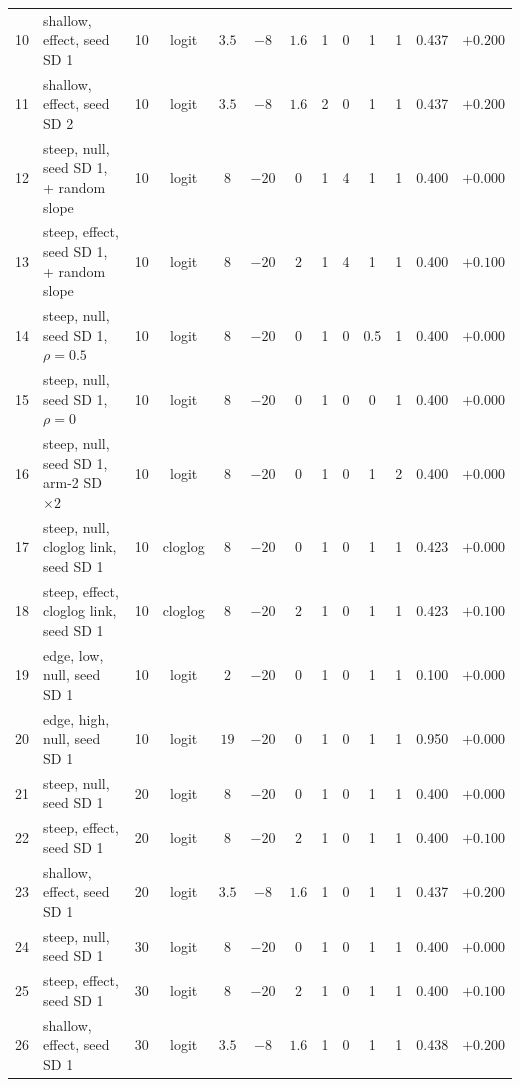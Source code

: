 \begin{table}[H]
\begin{tabular}{@{}rlcccccccccrr@{}}
10 & shallow, effect, seed SD 1 & 10 & logit & $3.5$ & $-8$ & $1.6$ & 1 & 0 & 1 & 1 & 0.437 & $+0.200$ \\
11 & shallow, effect, seed SD 2 & 10 & logit & $3.5$ & $-8$ & $1.6$ & 2 & 0 & 1 & 1 & 0.437 & $+0.200$ \\
12 & steep, null, seed SD 1, + random slope & 10 & logit & $8$ & $-20$ & $0$ & 1 & 4 & 1 & 1 & 0.400 & $+0.000$ \\
13 & steep, effect, seed SD 1, + random slope & 10 & logit & $8$ & $-20$ & $2$ & 1 & 4 & 1 & 1 & 0.400 & $+0.100$ \\
14 & steep, null, seed SD 1, $\rho=0.5$ & 10 & logit & $8$ & $-20$ & $0$ & 1 & 0 & 0.5 & 1 & 0.400 & $+0.000$ \\
15 & steep, null, seed SD 1, $\rho=0$ & 10 & logit & $8$ & $-20$ & $0$ & 1 & 0 & 0 & 1 & 0.400 & $+0.000$ \\
16 & steep, null, seed SD 1, arm-2 SD $\times2$ & 10 & logit & $8$ & $-20$ & $0$ & 1 & 0 & 1 & 2 & 0.400 & $+0.000$ \\
17 & steep, null, cloglog link, seed SD 1 & 10 & cloglog & $8$ & $-20$ & $0$ & 1 & 0 & 1 & 1 & 0.423 & $+0.000$ \\
18 & steep, effect, cloglog link, seed SD 1 & 10 & cloglog & $8$ & $-20$ & $2$ & 1 & 0 & 1 & 1 & 0.423 & $+0.100$ \\
19 & edge, low, null, seed SD 1 & 10 & logit & $2$ & $-20$ & $0$ & 1 & 0 & 1 & 1 & 0.100 & $+0.000$ \\
20 & edge, high, null, seed SD 1 & 10 & logit & $19$ & $-20$ & $0$ & 1 & 0 & 1 & 1 & 0.950 & $+0.000$ \\
21 & steep, null, seed SD 1 & 20 & logit & $8$ & $-20$ & $0$ & 1 & 0 & 1 & 1 & 0.400 & $+0.000$ \\
22 & steep, effect, seed SD 1 & 20 & logit & $8$ & $-20$ & $2$ & 1 & 0 & 1 & 1 & 0.400 & $+0.100$ \\
23 & shallow, effect, seed SD 1 & 20 & logit & $3.5$ & $-8$ & $1.6$ & 1 & 0 & 1 & 1 & 0.437 & $+0.200$ \\
24 & steep, null, seed SD 1 & 30 & logit & $8$ & $-20$ & $0$ & 1 & 0 & 1 & 1 & 0.400 & $+0.000$ \\
25 & steep, effect, seed SD 1 & 30 & logit & $8$ & $-20$ & $2$ & 1 & 0 & 1 & 1 & 0.400 & $+0.100$ \\
26 & shallow, effect, seed SD 1 & 30 & logit & $3.5$ & $-8$ & $1.6$ & 1 & 0 & 1 & 1 & 0.438 & $+0.200$ \\
\bottomrule
\end{tabular}
\end{table}
